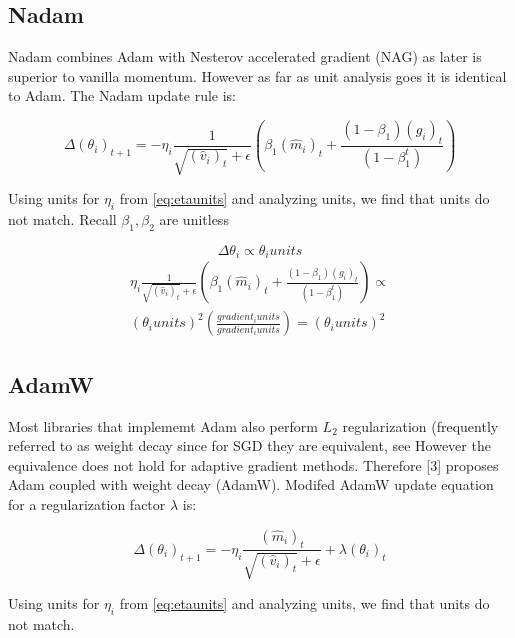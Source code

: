 \documentclass{article}
\begin{document}
\subsection{Nadam}
	Nadam \cite{dozat2016incorporating} combines Adam with Nesterov accelerated gradient (NAG) as later is superior to vanilla momentum. However as far as unit analysis goes it is identical to Adam. The Nadam update rule is:
	
	\begin{center} 
		\begin{equation} \Delta (\theta_{i})_{t+1} =  - \eta_{i} \frac{1}{\sqrt{(\hat{v}_{i})_{t}} + \epsilon} (\beta_{1}(\hat{m}_{i})_{t} + \frac{(1 - \beta_{1})(g_{i})_{t}}{(1 - \beta_{1}^{t})})	\label{eq:nadamupdate} \end{equation}
	\end{center}

	Using units for $\eta_{i}$ from \ref{eq:etaunits}  and analyzing units, we find that units do not match. Recall $\beta_{1}, \beta_{2}$ are unitless
	
	\begin{center} 
		\begin{equation}  \Delta \theta_{i} \propto \theta_{i} units \end{equation}  
		\begin{equation}  
		\begin{split}
				\eta_{i} \frac{1}{\sqrt{(\hat{v}_{i})_{t}} + \epsilon} (\beta_{1}(\hat{m}_{i})_{t} + \frac{(1 - \beta_{1})(g_{i})_{t}}{(1 - \beta_{1}^{t})}) \propto \\
				(\theta_{i} units)^{2} (\frac{gradient_{i} units}{gradient_{i} units}) = (\theta_{i} units)^{2} 
		\end{split} 
		\end{equation}
	\end{center}
   
\subsection{AdamW}
	Most libraries that implememt Adam also perform $L_{2}$ regularization (frequently referred to as weight decay since for SGD they are equivalent, see \cite{DBLP:journals/corr/abs-1711-05101} However the equivalence does not hold for adaptive gradient methods. Therefore [3] proposes Adam coupled with weight decay (AdamW). Modifed AdamW update equation for a regularization factor $\lambda$ is:
	
	\begin{center} 
		\begin{equation} \Delta (\theta_{i})_{t+1} =  - \eta_{i} \frac{(\hat{m}_{i})_{t}}{\sqrt{(\hat{v}_{i})_{t}} + \epsilon} + \lambda (\theta_{i})_{t} 	\label{eq:adamwupdate} \end{equation}
	\end{center}

	Using units for $\eta_{i}$ from \ref{eq:etaunits}  and analyzing units, we find that units do not match.



\end{document}
